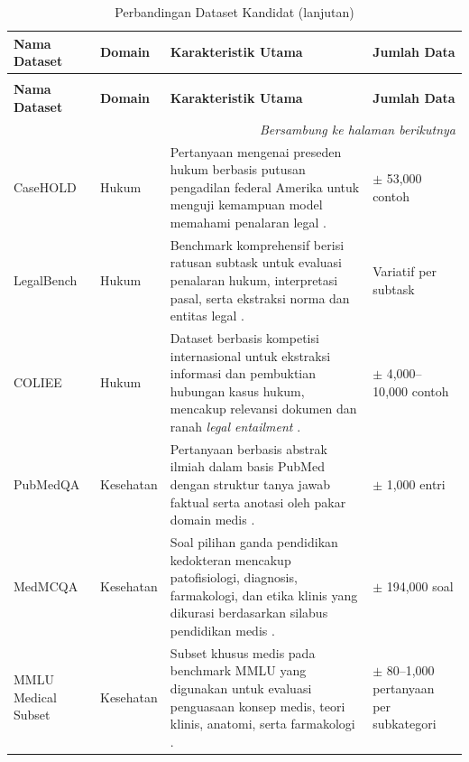 \begin{longtable}{|p{2.2cm}|p{1.5cm}|p{5cm}|p{2.8cm}|}
\caption{Perbandingan Dataset Kandidat}
\label{tbl:dataset_kandidat} \\
\hline
\textbf{Nama Dataset} &
\textbf{Domain} &
\textbf{Karakteristik Utama} &
\textbf{Jumlah Data} \\
\hline
\endfirsthead

\caption[]{Perbandingan Dataset Kandidat (lanjutan)} \\
\hline
\textbf{Nama Dataset} &
\textbf{Domain} &
\textbf{Karakteristik Utama} &
\textbf{Jumlah Data} \\
\hline
\endhead

\hline
\multicolumn{4}{r}{\textit{Bersambung ke halaman berikutnya}} \\
\endfoot

\hline
\endlastfoot

CaseHOLD &
Hukum &
Pertanyaan mengenai preseden hukum berbasis putusan pengadilan federal Amerika untuk menguji kemampuan model memahami penalaran legal \parencite{casehold}. &
$\pm$ 53{,}000 contoh
\\ \hline

LegalBench &
Hukum &
Benchmark komprehensif berisi ratusan subtask untuk evaluasi penalaran hukum, interpretasi pasal, serta ekstraksi norma dan entitas legal \parencite{legalbench}. &
Variatif per subtask
\\ \hline

COLIEE &
Hukum &
Dataset berbasis kompetisi internasional untuk ekstraksi informasi dan pembuktian hubungan kasus hukum, mencakup relevansi dokumen dan ranah \textit{legal entailment} \parencite{coliee}. &
$\pm$ 4{,}000--10{,}000 contoh
\\ \hline

PubMedQA &
Kesehatan &
Pertanyaan berbasis abstrak ilmiah dalam basis PubMed dengan struktur tanya jawab faktual serta anotasi oleh pakar domain medis \parencite{pubmedqa}. &
$\pm$ 1{,}000 entri
\\ \hline

MedMCQA &
Kesehatan &
Soal pilihan ganda pendidikan kedokteran mencakup patofisiologi, diagnosis, farmakologi, dan etika klinis yang dikurasi berdasarkan silabus pendidikan medis \parencite{medmcqa}. &
$\pm$ 194{,}000 soal
\\ \hline

MMLU Medical Subset &
Kesehatan &
Subset khusus medis pada benchmark MMLU yang digunakan untuk evaluasi penguasaan konsep medis, teori klinis, anatomi, serta farmakologi \parencite{mmlu}. &
$\pm$ 80--1{,}000 pertanyaan per subkategori
\\ \hline


\end{longtable}
